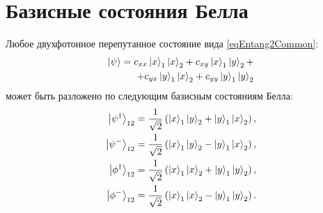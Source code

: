 \section{Базисные состояния Белла}

Любое двухфотонное перепутанное состояние вида \eqref{eqEntang2Common}:
\begin{eqnarray}
\left|\psi\right> =  
c_{xx} \ket{x}_1\ket{x}_2 +
c_{xy} \ket{x}_1\ket{y}_2 +
\nonumber \\
+
c_{yx} \ket{y}_1\ket{x}_2 +
c_{yy} \ket{y}_1\ket{y}_2
\nonumber
\end{eqnarray}
может быть разложено по следующим базисным состояниям Белла:
\begin{eqnarray}
  \left|\psi^{\dag}\right>_{12} = 
  \frac{1}{\sqrt{2}}\left(
  \ket{x}_1\ket{y}_2 + 
  \ket{y}_1\ket{x}_2
  \right),
  \nonumber \\
  \left|\psi^{-}\right>_{12} = 
  \frac{1}{\sqrt{2}}\left(
  \ket{x}_1\ket{y}_2 - 
  \ket{y}_1\ket{x}_2
  \right),
  \nonumber \\
  \left|\phi^{\dag}\right>_{12} = 
  \frac{1}{\sqrt{2}}\left(
  \ket{x}_1\ket{x}_2 + 
  \ket{y}_1\ket{y}_2
  \right),
  \nonumber \\
  \left|\phi^{-}\right>_{12} = 
  \frac{1}{\sqrt{2}}\left(
  \ket{x}_1\ket{x}_2 - 
  \ket{y}_1\ket{y}_2
  \right).
  \label{eqEntangBellBase}
\end{eqnarray}
 
